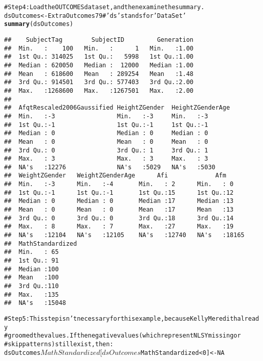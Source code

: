 \documentclass[letterpaper]{article}\usepackage{graphicx, color}
\makeatletter
\newcommand{\hlfunctioncall}[1]{\textcolor[rgb]{0.501960784313725,0,0.329411764705882}{\textbf{#1}}}%
\newcommand{\hlstring}[1]{\textcolor[rgb]{0.6,0.6,1}{#1}}%
\newcommand{\hlcomment}[1]{\textcolor[rgb]{0.180392156862745,0.6,0.341176470588235}{#1}}%
\newenvironment{kframe}{%
 \def\at@end@of@kframe{}%
 \ifinner\ifhmode%
  \def\at@end@of@kframe{\end{minipage}}%
  \begin{minipage}{\columnwidth}%
 \fi\fi%
 \def\FrameCommand##1{\hskip\@totalleftmargin \hskip-\fboxsep
 \colorbox{shadecolor}{##1}\hskip-\fboxsep
     \hskip-\linewidth \hskip-\@totalleftmargin \hskip\columnwidth}%
 \MakeFramed {\advance\hsize-\width
   \@totalleftmargin\z@ \linewidth\hsize
   \@setminipage}}%
 {\par\unskip\endMakeFramed%
 \at@end@of@kframe}
\newenvironment{knitrout}{}{} %
\makeatother
\begin{document}
\begin{knitrout}
\begin{kframe}
\begin{alltt}
\hlcomment{#Step 4: Load the OUTCOMES dataset, and then examine the summary.}
dsOutcomes <- ExtraOutcomes79 \hlcomment{#\hlstring{'ds'} stands for \hlstring{'Data Set'}}
\hlfunctioncall{summary}(dsOutcomes)
\end{alltt}
\begin{verbatim}
##    SubjectTag        SubjectID         Generation  
##  Min.   :    100   Min.   :      1   Min.   :1.00  
##  1st Qu.: 314025   1st Qu.:   5998   1st Qu.:1.00  
##  Median : 620050   Median :  12000   Median :1.00  
##  Mean   : 618600   Mean   : 289254   Mean   :1.48  
##  3rd Qu.: 914501   3rd Qu.: 577403   3rd Qu.:2.00  
##  Max.   :1268600   Max.   :1267501   Max.   :2.00  
##                                                    
##  AfqtRescaled2006Gaussified HeightZGender  HeightZGenderAge
##  Min.   :-3                 Min.   :-3     Min.   :-3      
##  1st Qu.:-1                 1st Qu.:-1     1st Qu.:-1      
##  Median : 0                 Median : 0     Median : 0      
##  Mean   : 0                 Mean   : 0     Mean   : 0      
##  3rd Qu.: 0                 3rd Qu.: 1     3rd Qu.: 1      
##  Max.   : 3                 Max.   : 3     Max.   : 3      
##  NA's   :12276              NA's   :5029   NA's   :5030    
##  WeightZGender   WeightZGenderAge      Afi             Afm       
##  Min.   :-3      Min.   :-4       Min.   : 2      Min.   : 0     
##  1st Qu.:-1      1st Qu.:-1       1st Qu.:15      1st Qu.:12     
##  Median : 0      Median : 0       Median :17      Median :13     
##  Mean   : 0      Mean   : 0       Mean   :17      Mean   :13     
##  3rd Qu.: 0      3rd Qu.: 0       3rd Qu.:18      3rd Qu.:14     
##  Max.   : 8      Max.   : 7       Max.   :27      Max.   :19     
##  NA's   :12104   NA's   :12105    NA's   :12740   NA's   :18165  
##  MathStandardized
##  Min.   : 65     
##  1st Qu.: 91     
##  Median :100     
##  Mean   :100     
##  3rd Qu.:110     
##  Max.   :135     
##  NA's   :15048
\end{verbatim}
\begin{alltt}

\hlcomment{#Step 5: This step isn't necessary for this example, because Kelly Meredith already }
\hlcomment{#   groomed the values.  If the negative values (which represent NLSY missing or }
\hlcomment{#   skip patterns) still exist, then:}
dsOutcomes$MathStandardized[dsOutcomes$MathStandardized < 0] <- NA


\end{alltt}
\end{kframe}
\end{knitrout}
\end{document}

